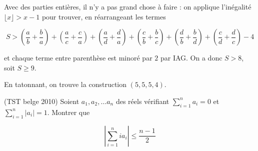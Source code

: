 \begin{sol}
Avec des parties entières, il n'y a pas grand chose à faire : on applique l'inégalité $\lfloor x \rfloor >x-1$ pour trouver, en réarrangeant les termes

\[S > \left(\frac{a}{b}+ \frac{b}{a}\right) + \left(\frac{a}{c}+ \frac{c}{a}\right)+\left(\frac{a}{d}+ \frac{d}{a}\right) +\left(\frac{c}{b}+ \frac{b}{c}\right) +\left(\frac{d}{b}+ \frac{b}{d}\right) + \left(\frac{c}{d}+ \frac{d}{c}\right)-4\]

et chaque terme entre parenthèse est minoré par $2$ par IAG. On a donc $S>8$, soit $S\geqslant 9$. 

En tatonnant, on trouve la construction $(5,5,5,4)$. 
\end{sol}

\begin{exo}
(TST belge 2010) 
Soient $a_1,a_2,\ldots a_n$ des réels vérifiant $\sum_{i=1}^{n} a_i=0$ et $\sum_{i=1}^{n} |a_i| =1$. Montrer que 

\[\left| \sum_{i=1}^{n} ia_i \right| \leqslant \frac{n-1}2\]
\end{exo}

